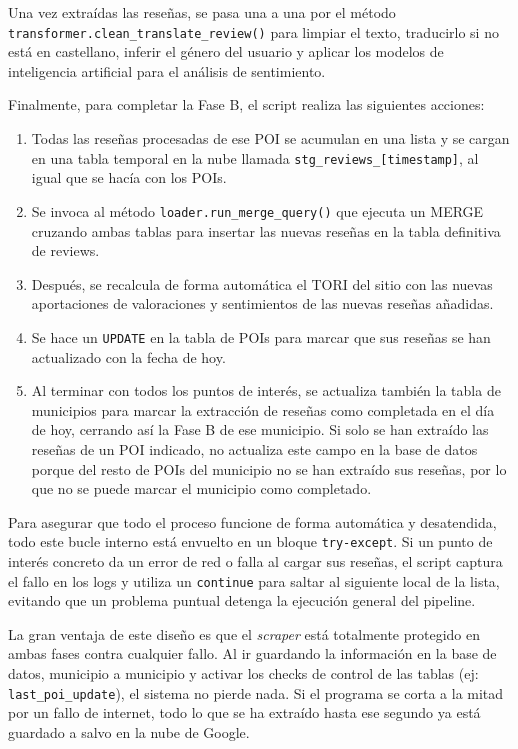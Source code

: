 Una vez extraídas las reseñas, se pasa una a una por el método \texttt{trans\-former.clean\_translate\_review()} para limpiar el texto, traducirlo si no está en castellano, inferir el género del usuario y aplicar los modelos de inteligencia artificial para el análisis de sentimiento.

Finalmente, para completar la Fase B, el script realiza las siguientes acciones:

\begin{enumerate}
    \item Todas las reseñas procesadas de ese POI se acumulan en una lista y se cargan en una tabla temporal en la nube llamada \texttt{stg\_reviews\-\_[timestamp]}, al igual que se hacía con los POIs.
    \item Se invoca al método \texttt{loader.run\_merge\_query()} que ejecuta un MERGE cruzando ambas tablas para insertar las nuevas reseñas en la tabla definitiva de reviews.
    \item Después, se recalcula de forma automática el TORI del sitio con las nuevas aportaciones de valoraciones y sentimientos de las nuevas reseñas añadidas.
    \item Se hace un \texttt{UPDATE} en la tabla de POIs para marcar que sus reseñas se han actualizado con la fecha de hoy.
    \item Al terminar con todos los puntos de interés, se actualiza también la tabla de municipios para marcar la extracción de reseñas como completada en el día de hoy, cerrando así la Fase B de ese municipio. Si solo se han extraído las reseñas de un POI indicado, no actualiza este campo en la base de datos porque del resto de POIs del municipio no se han extraído sus reseñas, por lo que no se puede marcar el municipio como completado.
\end{enumerate}

Para asegurar que todo el proceso funcione de forma automática y desatendida, todo este bucle interno está envuelto en un bloque \texttt{try-except}. Si un punto de interés concreto da un error de red o falla al cargar sus reseñas, el script captura el fallo en los logs y utiliza un \texttt{continue} para saltar al siguiente local de la lista, evitando que un problema puntual detenga la ejecución general del pipeline.

La gran ventaja de este diseño es que el \textit{scraper} está totalmente protegido en ambas fases contra cualquier fallo. Al ir guardando la información en la base de datos, municipio a municipio y activar los checks de control de las tablas (ej: \texttt{last\_poi\_update}), el sistema no pierde nada. Si el programa se corta a la mitad por un fallo de internet, todo lo que se ha extraído hasta ese segundo ya está guardado a salvo en la nube de Google.

